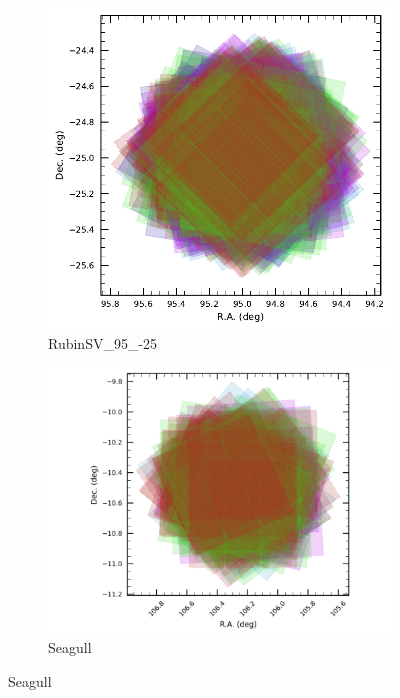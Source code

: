 \begin{figure}[ht]
    \begin{subfigure}[b]{0.22\textwidth}
      \centering
        \includegraphics[width=\linewidth]{showVisit_DP1_RubinSV_95_-25}
        \caption{RubinSV\_95\_-25}
    \end{subfigure}\hfill
    \begin{subfigure}[b]{0.22\textwidth}
        \centering
        \includegraphics[width= \linewidth]{showVisit_DP1_Seagull}
        \caption{Seagull}
    \end{subfigure}\hfill

\end{figure}
